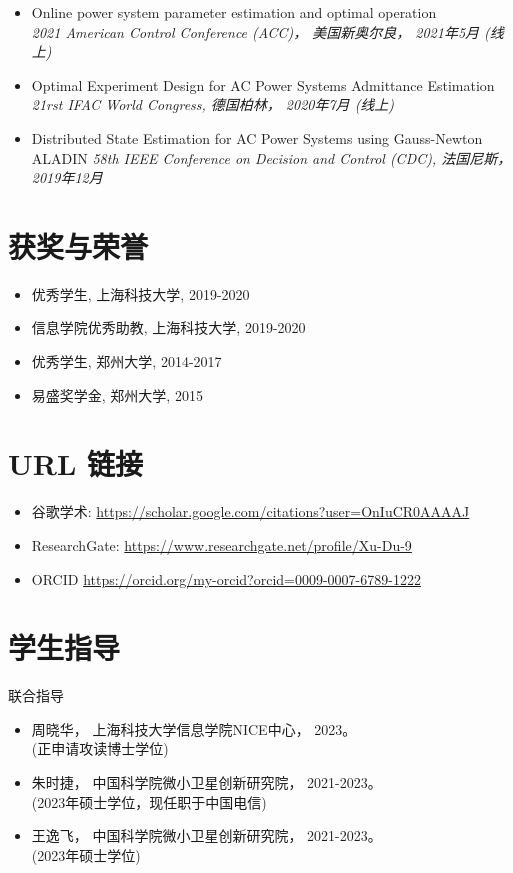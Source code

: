 \documentclass[paper=a4,fontsize=11pt]{scrartcl} %
\newcommand{\sepspace}{\vspace*{1em}}		%
\newcommand{\NewPart}[1]{\section*{\uppercase{#1}}}
\newcommand{\EducationEntry}[4]{
		\noindent \textbf{#1} \hfill      %
		\colorbox{White}{%
			\parbox{5cm}{%
			\hfill\color{Black}#2}} \par  %
		\noindent \textit{#3} \par        %
		\noindent\hangindent=2em\hangafter=0 \small #4 %
		\normalsize \par}
\begin{document}
\begin{CJK*}{UTF8}{gbsn}
\begin{itemize}
	
	\item  {
		{Online power system parameter estimation and optimal operation}\\
		\emph{2021 American Control Conference (ACC)， 美国新奥尔良， 2021年5月 (线上)
	} }
	
	\item  {
		Optimal Experiment Design for AC Power Systems Admittance Estimation\\
		\emph{21rst IFAC World Congress, 德国柏林， 2020年7月 (线上)
	} }
	
	\item  {
		Distributed State Estimation for AC Power Systems using Gauss-Newton ALADIN 
		\emph{58th IEEE Conference on Decision and Control (CDC),
			法国尼斯， 2019年12月} }
\end{itemize}


\NewPart{获奖与荣誉}
\begin{itemize}
	\item 优秀学生, 上海科技大学, 2019-2020
	
	\item 信息学院优秀助教, 上海科技大学, 2019-2020
		
	
	\item 优秀学生, 郑州大学, 2014-2017
	
	\item 易盛奖学金, 郑州大学, 2015
	
	
	\end{itemize}
%
\NewPart{URL 链接}
\begin{itemize}
	\item 谷歌学术: \url{https://scholar.google.com/citations?user=OnIuCR0AAAAJ}
	\item ResearchGate: \url{https://www.researchgate.net/profile/Xu-Du-9}
	\item ORCID \url{https://orcid.org/my-orcid?orcid=0009-0007-6789-1222}
\end{itemize}
\NewPart{学生指导}{联合指导}
\begin{itemize}
			\item 周晓华， 上海科技大学信息学院NICE中心， 2023。\\
	(正申请攻读博士学位)
		\item 朱时捷， 中国科学院微小卫星创新研究院， 2021-2023。\\
	(2023年硕士学位，现任职于中国电信)
	\item 王逸飞， 中国科学院微小卫星创新研究院， 2021-2023。\\
	(2023年硕士学位)
	

\end{itemize}
\end{CJK*}
\end{document}
